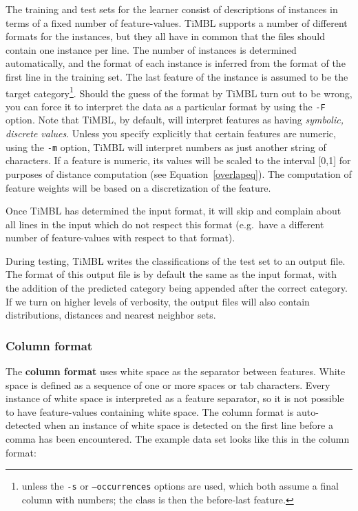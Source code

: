 \documentclass{book}
\begin{document}
The training and test sets for the learner consist of descriptions of
instances in terms of a fixed number of feature-values. TiMBL supports
a number of different formats for the instances, but they all have in
common that the files should contain one instance per line. The number
of instances is determined automatically, and the format of each
instance is inferred from the format of the first line in the training
set. The last feature of the instance is assumed to be the target
category\footnote{unless the {\tt -s} or {\tt --occurrences} options are used,
which both assume a final column with numbers; the class is then the
before-last feature.}. Should the guess of the format by TiMBL turn out to be
wrong, you can force it to interpret the data as a particular format
by using the {\tt -F} option. Note that TiMBL, by default, will
interpret features as having {\em symbolic, discrete values}. Unless
you specify explicitly that certain features are numeric, using the
{\tt -m} option, TiMBL will interpret numbers as just another string
of characters. If a feature is numeric, its values will be scaled to
the interval [0,1] for purposes of distance computation (see
Equation~\ref{overlapeq}). The computation of feature weights will be
based on a discretization of the feature.

Once TiMBL has determined the input format, it will skip and complain
about all lines in the input which do not respect this format
(e.g.~have a different number of feature-values with respect to that
format).

During testing, TiMBL writes the classifications of the test set to an
output file. The format of this output file is by default the same as
the input format, with the addition of the predicted category being
appended after the correct category. If we turn on higher levels of
verbosity, the output files will also contain distributions, distances
and nearest neighbor sets.

\subsubsection{Column format}
\label{comlumnformat}

The {\bf column format} uses white space as the separator between
features. White space is defined as a sequence of one or more spaces or
tab characters. Every instance of white space is interpreted as a
feature separator, so it is not possible to have feature-values
containing white space. The column format is auto-detected when an
instance of white space is detected on the first line before a
comma has been encountered. The example data set looks like this in
the column format:
\end{document}
